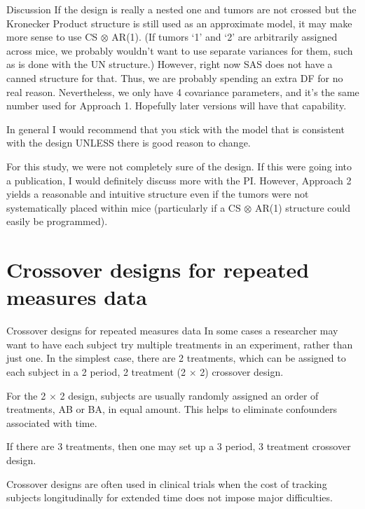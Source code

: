 \documentclass[
  9pt,
  ignorenonframetext,
]{beamer}
\begin{document}
\begin{frame}{Discussion}
\protect\hypertarget{discussion-1}{}
If the design is really a nested one and tumors are not crossed but the
Kronecker Product structure is still used as an approximate model, it
may make more sense to use CS \(\otimes\) AR(1). (If tumors `1' and `2'
are arbitrarily assigned across mice, we probably wouldn't want to use
separate variances for them, such as is done with the UN structure.)
However, right now SAS does not have a canned structure for that. Thus,
we are probably spending an extra DF for no real reason. Nevertheless,
we only have 4 covariance parameters, and it's the same number used for
Approach 1. Hopefully later versions will have that capability.

In general I would recommend that you stick with the model that is
consistent with the design UNLESS there is good reason to change.

For this study, we were not completely sure of the design. If this were
going into a publication, I would definitely discuss more with the PI.
However, Approach 2 yields a reasonable and intuitive structure even if
the tumors were not systematically placed within mice (particularly if a
CS \(\otimes\) AR(1) structure could easily be programmed).
\end{frame}

\hypertarget{crossover-designs-for-repeated-measures-data}{%
\section{Crossover designs for repeated measures
data}\label{crossover-designs-for-repeated-measures-data}}

\begin{frame}{Crossover designs for repeated measures data}
\protect\hypertarget{crossover-designs-for-repeated-measures-data-1}{}
In some cases a researcher may want to have each subject try multiple
treatments in an experiment, rather than just one. In the simplest case,
there are 2 treatments, which can be assigned to each subject in a 2
period, 2 treatment (2 \(\times\) 2) crossover design.

For the 2 \(\times\) 2 design, subjects are usually randomly assigned an
order of treatments, AB or BA, in equal amount. This helps to eliminate
confounders associated with time.

If there are 3 treatments, then one may set up a 3 period, 3 treatment
crossover design.

Crossover designs are often used in clinical trials when the cost of
tracking subjects longitudinally for extended time does not impose major
difficulties.
\end{frame}
\end{document}
